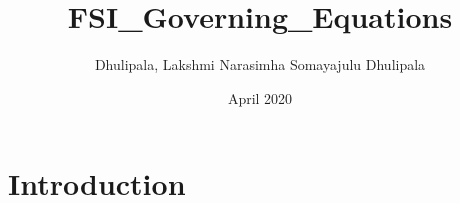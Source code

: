 \documentclass{article}
\title{FSI_Governing_Equations}
\author{Dhulipala, Lakshmi Narasimha Somayajulu Dhulipala}
\date{April 2020}
\begin{document}
\maketitle

\section{Introduction}
\end{document}
